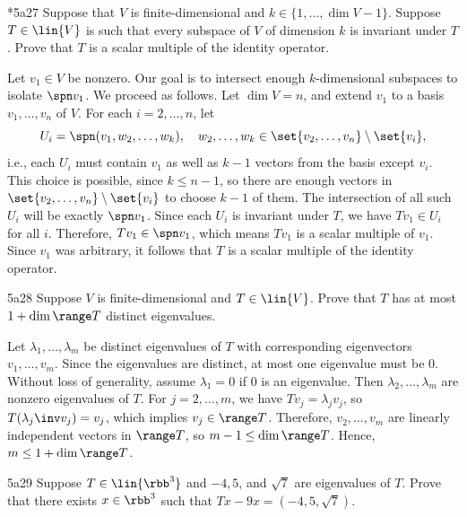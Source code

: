 \begin{exercise}*{5a27}
    Suppose that $V$ is finite-dimensional and $k \in \{1, \ldots, \dim V - 1\}$.
	Suppose $T \in \lin{V}$ is such that every subspace of $V$ of dimension $k$ is invariant under $T$.
	Prove that $T$ is a scalar multiple of the identity operator.
\end{exercise}

\begin{sol}
    Let $v_1 \in V$ be nonzero.
	Our goal is to intersect enough $k$-dimensional subspaces to isolate $\spn v_1$.
	We proceed as follows.
	Let $\dim V = n$, and extend $v_1$ to a basis $v_1, \ldots, v_n$ of $V$.
	For each $i = 2, \ldots, n$, let
    \[
    	U_i = \spn(v_1, w_2, \ldots, w_k), \quad w_2, \ldots, w_k \in \set{v_2, \ldots, v_n} \setminus \set{v_i},
    \]
    i.e., each $U_i$ must contain $v_1$ as well as $k - 1$ vectors from the basis except $v_i$.
	This choice is possible, since $k \leq n - 1$, so there are enough vectors in $\set{v_2, \ldots, v_n} \setminus \set{v_i}$ to choose $k - 1$ of them.
	The intersection of all such $U_i$ will be exactly $\spn v_1$.
	Since each $U_i$ is invariant under $T$, we have $Tv_1 \in U_i$ for all $i$.
	Therefore, $Tv_1 \in \spn v_1$, which means $Tv_1$ is a scalar multiple of $v_1$.
	Since $v_1$ was arbitrary, it follows that $T$ is a scalar multiple of the identity operator.
\end{sol}

\begin{exercise}{5a28}
    Suppose $V$ is finite-dimensional and $T \in \lin{V}$.
	Prove that $T$ has at most $1 + \dim \range T$ distinct eigenvalues.
\end{exercise}

\begin{sol}
    Let $\lambda_1, \ldots, \lambda_m$ be distinct eigenvalues of $T$ with corresponding eigenvectors $v_1, \ldots, v_m$.
	Since the eigenvalues are distinct, at most one eigenvalue must be 0.
	Without loss of generality, assume $\lambda_1 = 0$ if 0 is an eigenvalue.
    Then $\lambda_2, \ldots, \lambda_m$ are nonzero eigenvalues of $T$.
    For $j = 2, \ldots, m$, we have $Tv_j = \lambda_j v_j$, so $T(\lambda_j\inv v_j) = v_j$, which implies $v_j \in \range T$.
    Therefore, $v_2, \ldots, v_m$ are linearly independent vectors in $\range T$, so $m - 1 \leq \dim \range T$.
    Hence, $m \leq 1 + \dim \range T$.
\end{sol}

\begin{exercise}{5a29}
    Suppose $T \in \lin{\rbb^3}$ and $-4, 5$, and $\sqrt{7}$ are eigenvalues of $T$.
	Prove that there exists $x \in \rbb^3$ such that $Tx - 9x = (-4, 5, \sqrt{7})$.
\end{exercise}

